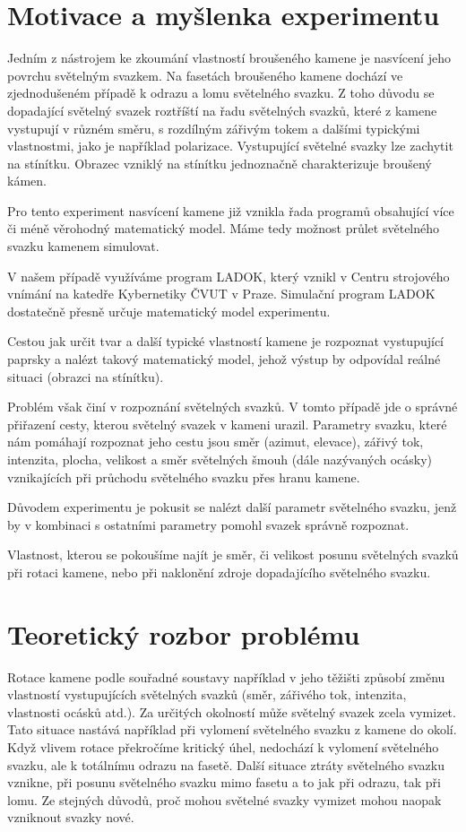 \section*{Motivace a myšlenka experimentu}

Jedním z nástrojem ke zkoumání vlastností broušeného kamene je nasvícení jeho povrchu světelným svazkem. Na fasetách broušeného kamene dochází ve zjednodušeném případě k odrazu a lomu světelného svazku. Z toho důvodu se dopadající světelný svazek roztříští na řadu světelných svazků, které z kamene vystupují v různém směru, s rozdílným zářivým tokem a dalšími typickými vlastnostmi, jako je například polarizace. 
Vystupující světelné svazky lze zachytit na stínítku. Obrazec vzniklý na stínítku jednoznačně charakterizuje broušený kámen. 

Pro tento experiment nasvícení kamene již vznikla řada programů obsahující více či méně věrohodný matematický model. Máme tedy možnost průlet světelného svazku kamenem simulovat. 

V našem případě využíváme program LADOK, který vznikl v Centru strojového vnímání na katedře Kybernetiky ČVUT v Praze. Simulační program LADOK dostatečně přesně určuje matematický model experimentu.

Cestou jak určit tvar a další typické vlastností kamene je rozpoznat vystupující paprsky a nalézt takový matematický model, jehož výstup by odpovídal reálné situaci (obrazci na stínítku). 

Problém však činí v rozpoznání světelných svazků. V tomto případě jde o správné přiřazení cesty, kterou světelný svazek v kameni urazil. Parametry svazku, které nám pomáhají rozpoznat jeho cestu jsou směr (azimut, elevace), zářivý tok, intenzita, plocha, velikost a směr světelných šmouh (dále nazývaných ocásky) vznikajících při průchodu světelného svazku přes hranu kamene. 

Důvodem experimentu je pokusit se nalézt další parametr světelného svazku, jenž by v kombinaci s ostatními parametry pomohl svazek správně rozpoznat. 

Vlastnost, kterou se pokoušíme najít je směr, či velikost posunu světelných svazků při rotaci kamene, nebo při naklonění zdroje dopadajícího světelného svazku. 

\newpage
\section*{Teoretický rozbor problému}

Rotace kamene podle souřadné soustavy například v jeho těžišti způsobí změnu vlastností vystupujících světelných svazků (směr, zářivého tok, intenzita, vlastnosti ocásků atd.). Za určitých okolností může světelný svazek zcela vymizet. Tato situace nastává například při vylomení světelného svazku z kamene do okolí. Když vlivem rotace překročíme kritický úhel, nedochází k vylomení světelného svazku, ale k totálnímu odrazu na fasetě. Další situace ztráty světelného svazku vznikne, při posunu světelného svazku mimo fasetu a to jak při odrazu, tak při lomu. Ze stejných důvodů, proč mohou světelné svazky vymizet mohou naopak vzniknout svazky nové.

